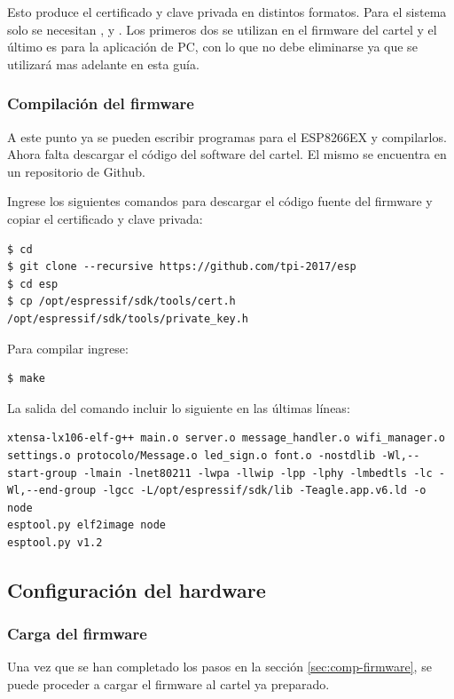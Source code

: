 Esto produce el certificado y clave privada en distintos formatos. Para el sistema solo se necesitan ,  y . Los primeros dos se utilizan en el firmware del cartel y el último es para la aplicación de PC, con lo que no debe eliminarse ya que se utilizará mas adelante en esta guía.

\subsubsection{Compilación del firmware}
A este punto ya se pueden escribir programas para el ESP8266EX y compilarlos. Ahora falta descargar el código del software del cartel. El mismo se encuentra en un repositorio de Github.


Ingrese los siguientes comandos para descargar el código fuente del firmware y copiar el certificado y clave privada:

\begin{lstlisting}
$ cd
$ git clone --recursive https://github.com/tpi-2017/esp
$ cd esp
$ cp /opt/espressif/sdk/tools/cert.h /opt/espressif/sdk/tools/private_key.h 
\end{lstlisting}

Para compilar ingrese:
\begin{lstlisting}
$ make
\end{lstlisting}

La salida del comando  incluir lo siguiente en las últimas líneas:
\begin{lstlisting}
xtensa-lx106-elf-g++ main.o server.o message_handler.o wifi_manager.o settings.o protocolo/Message.o led_sign.o font.o -nostdlib -Wl,--start-group -lmain -lnet80211 -lwpa -llwip -lpp -lphy -lmbedtls -lc -Wl,--end-group -lgcc -L/opt/espressif/sdk/lib -Teagle.app.v6.ld -o node
esptool.py elf2image node
esptool.py v1.2
\end{lstlisting}

\subsection{Configuración del hardware}
\subsubsection{Carga del firmware}
Una vez que se han completado los pasos en la sección \ref{sec:comp-firmware}, se puede proceder a cargar el firmware al cartel ya preparado.

